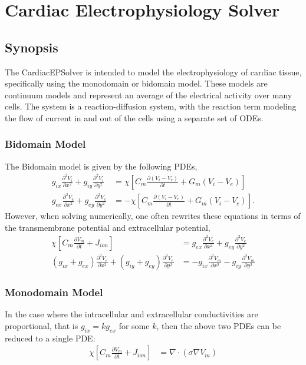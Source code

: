 \chapter{Cardiac Electrophysiology Solver}

\section{Synopsis}

The CardiacEPSolver is intended to model the electrophysiology of cardiac
tissue, specifically using the monodomain or bidomain model. These models are
continuum models and represent an average of the electrical activity over many
cells. The system is a reaction-diffusion system, with the reaction term
modeling the flow of current in and out of the cells using a separate set of
ODEs.

\subsection{Bidomain Model}
The Bidomain model is given by the following PDEs,
\begin{align*}
g_{ix}\frac{\partial^2 V_i}{\partial x^2} + g_{iy}\frac{\partial^2 V_i}{\partial y^2} &=  \chi \left[ C_m \frac{\partial(V_i-V_e)}{\partial t} + G_m(V_i-V_e) \right] \\
g_{ex}\frac{\partial^2 V_e}{\partial x^2} + g_{ey}\frac{\partial^2 V_e}{\partial y^2} &= -\chi\left[ C_m \frac{\partial(V_i-V_e)}{\partial t} + G_m(V_i-V_e) \right].
\end{align*}
However, when solving numerically, one often rewrites these equations in terms
of the transmembrane potential and extracellular potential,
\begin{align*}
\chi \left[ C_m \frac{\partial V_m}{\partial t} + J_{ion} \right] &= g_{ex}\frac{\partial^2 V_e}{\partial x^2} + g_{ey}\frac{\partial^2 V_e}{\partial y^2}\\
(g_{ix} + g_{ex})\frac{\partial^2 V_e}{\partial x^2} + (g_{iy} + g_{ey})\frac{\partial^2 V_e}{\partial y^2} 
  &= -g_{ix} \frac{\partial^2 V_m}{\partial x^2} - g_{iy} \frac{\partial^2 V_m}{\partial y^2}
\end{align*}

\subsection{Monodomain Model}
In the case where the intracellular and extracellular conductivities are
proportional, that is $g_{ix} = kg_{ex}$ for some $k$,
then the above two PDEs can be reduced to a single PDE:
\begin{align*}
\chi\left[ C_m \frac{\partial V_m}{\partial t} + J_{ion} \right] &= \nabla \cdot (\sigma \nabla V_m)
\end{align*}

